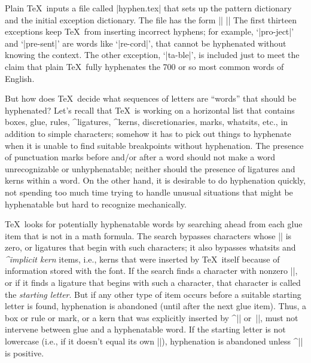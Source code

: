 \ddanger Plain \TeX\ inputs a file called |hyphen.tex| that sets up the
pattern dictionary and the initial exception dictionary. The file has the
form
\begindisplay
||\cr
||\cr
\enddisplay
The first thirteen exceptions keep \TeX\ from inserting incorrect
hyphens; for example, `|pro-ject|' and `|pre-sent|' are words like
`|re-cord|', that cannot be hyphenated without knowing the context.
The other exception, `|ta-ble|', is included just to meet the claim
that plain \TeX\ fully hyphenates the 700 or so most common words
of English.

\ddanger But how does \TeX\ decide what sequences of letters are ``words''
that should be hyphenated? Let's recall that \TeX\ is working on a
horizontal list that contains boxes, glue, rules, ^{ligatures}, ^{kerns},
discretionaries, marks, whatsits, etc., in addition to simple characters;
somehow it has to pick out things to hyphenate when it is unable to
find suitable breakpoints without hyphenation. The presence of
punctuation marks before and/or after a word should not make a word
unrecognizable or unhyphenatable; neither should the presence of
ligatures and kerns within a word. On the other hand, it is desirable to
do hyphenation quickly, not spending too much time trying to handle
unusual situations that might be hyphenatable but hard to recognize
\hbox{mechanically}.

\ddanger \TeX\ looks for potentially hyphenatable words by searching
ahead from each glue item that is not in a math formula. The search
bypasses characters whose |\lccode| is zero, or ligatures that begin
with such characters; it also bypasses whatsits and {\sl^{implicit kern}\/}
items, i.e., kerns that were inserted by \TeX\ itself because of information
stored with the font. If the search
finds a character with nonzero |\lccode|, or if it finds a ligature
that begins with such a character, that character is called the
{\sl starting letter}. But if any other type of item occurs before a suitable
starting letter is found, hyphenation is abandoned (until after the next
glue item). Thus, a box or rule or mark, or a kern that was explicitly
inserted by ^|\kern| or~|\/|, must not intervene between glue and a
hyphenatable word. If the starting letter is not lowercase (i.e.,
if it doesn't equal its own |\lccode|), hyphenation is abandoned unless
^|\uchyph| is positive.

